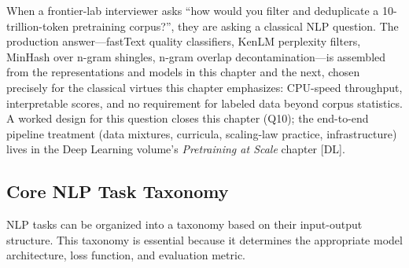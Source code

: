 \begin{keyinsight}
When a frontier-lab interviewer asks ``how would you filter and deduplicate a
10-trillion-token pretraining corpus?'', they are asking a classical NLP question. The
production answer---fastText quality classifiers, KenLM perplexity filters, MinHash over
n-gram shingles, n-gram overlap decontamination---is assembled from the representations
and models in this chapter and the next, chosen precisely for the classical virtues this
chapter emphasizes: CPU-speed throughput, interpretable scores, and no requirement for
labeled data beyond corpus statistics. A worked design for this question closes this
chapter (Q10); the end-to-end pipeline treatment (data mixtures, curricula, scaling-law
practice, infrastructure) lives in the Deep Learning volume's \emph{Pretraining at Scale}
chapter [DL].
\end{keyinsight}

\subsection{Core NLP Task Taxonomy}
\label{sec:task_taxonomy}

NLP tasks can be organized into a taxonomy based on their input-output structure. This
taxonomy is essential because it determines the appropriate model architecture, loss
function, and evaluation metric.

